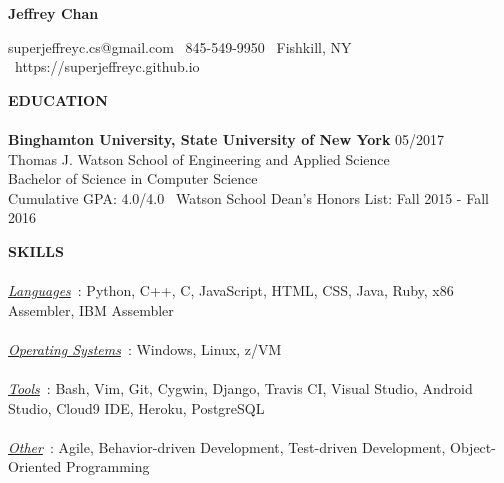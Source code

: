 \documentclass[10.5pt]{res}
\newcommand{\sectionSpace}{\vspace{-3.5pt}}
\begin{document}
 

\centerline{\LARGE \textbf{Jeffrey Chan}}
{\vspace{1pt}}
\centerline{superjeffreyc.cs@gmail.com \textbar ~845-549-9950 \textbar ~Fishkill, NY \textbar ~https://superjeffreyc.github.io}      
\vspace{-16pt}              

\begin{resume}                   

\textbf{EDUCATION} \\ [-10.5pt]
\noindent\makebox[\linewidth]{\rule{\textwidth}{0.4pt}}\\
\textbf{Binghamton University, State University of New York} \hfill 05/2017 \\
    	Thomas J. Watson School of Engineering and Applied Science \\
	Bachelor of Science in Computer Science \\
	Cumulative GPA: 4.0/4.0 \textbar~Watson School Dean's Honors List: Fall 2015 - Fall 2016 
	\sectionSpace

\textbf{SKILLS} \\ [-10.5pt]
\noindent\makebox[\linewidth]{\rule{\textwidth}{0.4pt}}\\
\underline{\it Languages}~: Python, C++, C, JavaScript, HTML, CSS, Java, Ruby, x86 Assembler, IBM Assembler \\
{\vspace{-10.5pt}} \\
\underline{\it Operating Systems}~: Windows, Linux, z/VM \\
{\vspace{-10.5pt}} \\
\underline{\it Tools}~: Bash, Vim, Git, Cygwin, Django, Travis CI, Visual Studio, Android Studio, Cloud9 IDE, Heroku, PostgreSQL \\
{\vspace{-10.5pt}} \\
\underline{\it Other}~: Agile, Behavior-driven Development, Test-driven Development, Object-Oriented Programming
\sectionSpace


\end{resume}
\end{document}
